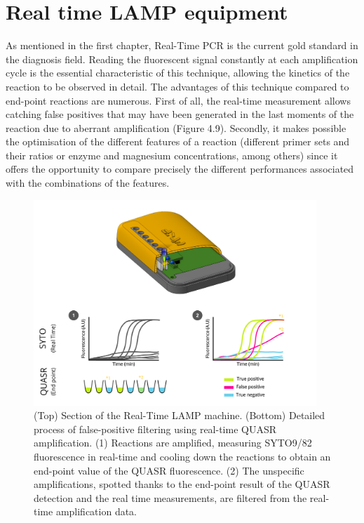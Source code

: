 \newpage

\section{Real time LAMP equipment}
As mentioned in the first chapter, Real-Time PCR is the current gold standard in the diagnosis field. Reading the fluorescent signal constantly at each amplification cycle is the essential characteristic of this technique, allowing the kinetics of the reaction to be observed in detail. The advantages of this technique compared to end-point reactions are numerous. First of all, the real-time measurement allows catching false positives that may have been generated in the last moments of the reaction due to aberrant amplification (Figure 4.9). Secondly, it makes possible the optimisation of the different features of a reaction (different primer sets and their ratios or enzyme and magnesium concentrations, among others) since it offers the opportunity to compare precisely the different performances associated with the combinations of the features.

\begin{figure}[b]
    \centering
    \includegraphics[width=0.95\textwidth,keepaspectratio]{figures/qlamp.png}
    \caption{(Top) Section of the Real-Time LAMP machine. (Bottom) Detailed process of false-positive filtering using real-time QUASR amplification. (1) Reactions are amplified, measuring SYTO9/82 fluorescence in real-time and cooling down the reactions to obtain an end-point value of the QUASR fluorescence. (2) The unspecific amplifications, spotted thanks to the end-point result of the QUASR detection and the real time measurements, are filtered from the real-time amplification data.}
    \label{qLAMP}
\end{figure}

